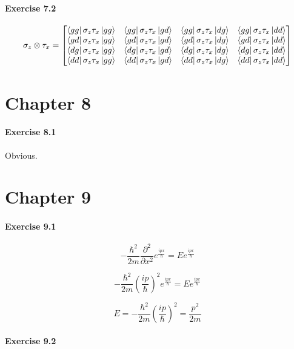 \documentclass[a4paper]{article}
\begin{document}
\paragraph{Exercise 7.2}

$$
    \sigma_{z} \otimes \tau_{x} =
    \begin{bmatrix}
        \bra{gg} \sigma_{z} \tau_{x} \ket{gg} & \bra{gg} \sigma_{z} \tau_{x} \ket{gd} & \bra{gg} \sigma_{z} \tau_{x} \ket{dg} & \bra{gg} \sigma_{z} \tau_{x} \ket{dd} \\
        \bra{gd} \sigma_{z} \tau_{x} \ket{gg} & \bra{gd} \sigma_{z} \tau_{x} \ket{gd} & \bra{gd} \sigma_{z} \tau_{x} \ket{dg} & \bra{gd} \sigma_{z} \tau_{x} \ket{dd} \\
        \bra{dg} \sigma_{z} \tau_{x} \ket{gg} & \bra{dg} \sigma_{z} \tau_{x} \ket{gd} & \bra{dg} \sigma_{z} \tau_{x} \ket{dg} & \bra{dg} \sigma_{z} \tau_{x} \ket{dd} \\
        \bra{dd} \sigma_{z} \tau_{x} \ket{gg} & \bra{dd} \sigma_{z} \tau_{x} \ket{gd} & \bra{dd} \sigma_{z} \tau_{x} \ket{dg} & \bra{dd} \sigma_{z} \tau_{x} \ket{dd}
    \end{bmatrix}
$$

\section{Chapter 8}

\paragraph{Exercise 8.1}

Obvious.

\section{Chapter 9}

\paragraph{Exercise 9.1}

$$
    - \frac{\hbar^{2}}{2 m} \frac{\partial^{2}}{\partial x^{2}} e^{\frac{i p x}{\hbar}} = E e^{\frac{i p x}{\hbar}}
$$

$$
    - \frac{\hbar^{2}}{2 m} (\frac{i p}{\hbar})^{2} e^{\frac{i p x}{\hbar}} = E e^{\frac{i p x}{\hbar}}
$$

$$
    E = - \frac{\hbar^{2}}{2 m} (\frac{i p}{\hbar})^{2} = \frac{p^{2}}{2 m}
$$

\paragraph{Exercise 9.2}
\end{document}
